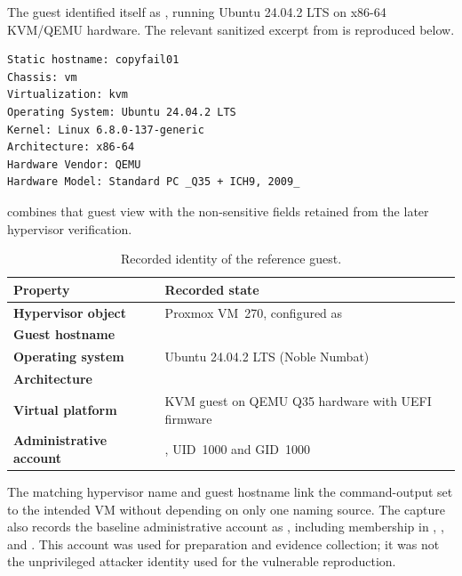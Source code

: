 The guest identified itself as , running Ubuntu 24.04.2 LTS
on x86-64 KVM/QEMU hardware. The relevant sanitized excerpt from
 is reproduced below.

\begin{lstlisting}
Static hostname: copyfail01
Chassis: vm
Virtualization: kvm
Operating System: Ubuntu 24.04.2 LTS
Kernel: Linux 6.8.0-137-generic
Architecture: x86-64
Hardware Vendor: QEMU
Hardware Model: Standard PC _Q35 + ICH9, 2009_
\end{lstlisting}

 combines that guest view with the
non-sensitive fields retained from the later hypervisor verification.

\begin{table}[H]
    \centering
    \caption{Recorded identity of the reference guest.}
    \label{tab:baseline-system-identity}
    \small
    \begin{tabularx}{0.92\textwidth}{@{}>{\bfseries}p{}Y@{}}
        \toprule
        Property & Recorded state \\
        \midrule
        Hypervisor object &
        Proxmox VM~270, configured as  \\

        Guest hostname &
         \\

        Operating system &
        Ubuntu 24.04.2 LTS (Noble Numbat) \\

        Architecture &
         \\

        Virtual platform &
        KVM guest on QEMU Q35 hardware with UEFI firmware \\

        Administrative account &
        , UID~1000 and GID~1000 \\
        \bottomrule
    \end{tabularx}
\end{table}

The matching hypervisor name and guest hostname link the command-output set to
the intended VM without depending on only one naming source. The
 capture also records the baseline administrative account as
, including membership in , , and
. This account was used for preparation and evidence collection; it
was not the unprivileged attacker identity used for the vulnerable
reproduction.

